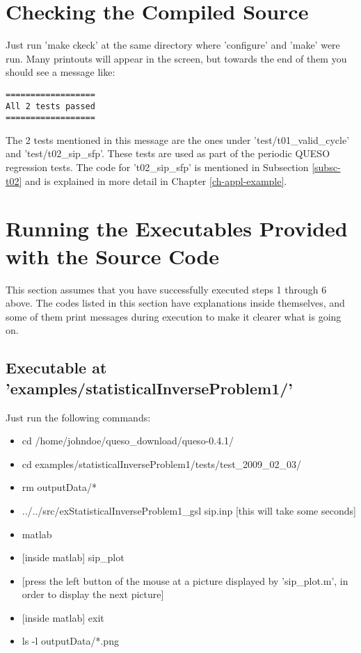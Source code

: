 \section{Checking the Compiled Source} \label{sc-checks}

Just run 'make ckeck' at the same directory where 'configure' and 'make' were run.
Many printouts will appear in the screen, but towards the end of them you should see
a message like:
\begin{verbatim}
==================
All 2 tests passed
==================
\end{verbatim}

The 2 tests mentioned in this message are the ones under 'test/t01\_valid\_cycle' and
'test/t02\_sip\_sfp'. These tests are used as part of the periodic QUESO regression tests.
The code for 't02\_sip\_sfp' is mentioned in Subsection \ref{subsc-t02} and is explained in more detail in Chapter \ref{ch-appl-example}.

\section{Running the Executables Provided with the Source Code} \label{sc-running-execs}

This section assumes that you have successfully executed steps 1 through 6 above.
The codes listed in this section have explanations inside themselves, and some of them
print messages during execution to make it clearer what is going on.

\subsection{Executable at 'examples/statisticalInverseProblem1/'}

Just run the following commands:
\begin{itemize}
\item cd /home/johndoe/queso\_download/queso-0.4.1/
\item cd examples/statisticalInverseProblem1/tests/test\_2009\_02\_03/
\item rm outputData/*
\item ../../src/exStatisticalInverseProblem1\_gsl sip.inp [this will take some seconds]
\item matlab
\item {[inside matlab]} sip\_plot
\item {[press the left button of the mouse at a picture displayed by 'sip\_plot.m', in order to display the next picture]}
\item {[inside matlab]} exit
\item ls -l outputData/*.png
\end{itemize}

